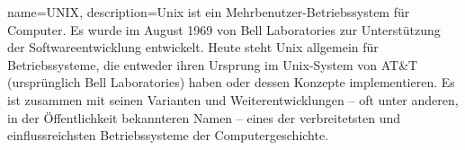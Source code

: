 	{%
		name={UNIX},
		description={Unix ist ein Mehrbenutzer-Betriebssystem für Computer. Es wurde im August 1969 von Bell Laboratories zur Unterstützung der Softwareentwicklung entwickelt. Heute steht Unix allgemein für Betriebssysteme, die entweder ihren Ursprung im Unix-System von AT&T (ursprünglich Bell Laboratories) haben oder dessen Konzepte implementieren. Es ist zusammen mit seinen Varianten und Weiterentwicklungen – oft unter anderen, in der Öffentlichkeit bekannteren Namen – eines der verbreitetsten und einflussreichsten Betriebssysteme der Computergeschichte.}
	}

\fi
